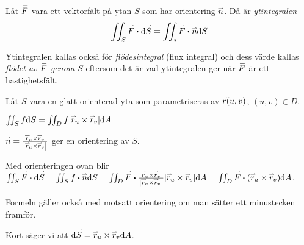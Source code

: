 \documentclass[a4paper]{article}
\begin{document}
\begin{sats}
    Låt \(
        \vef
    \) vara ett vektorfält på ytan \(
        S
    \) som har orientering \(
        \ve{n}
    \). Då är \emph{ytintegralen} \[
        \iint_S \vef \sprod \dd \ve{S} = \iint_s \vef \sprod \ve{n} \dd S
    \] 
\end{sats}

Ytintegralen kallas också för \emph{flödesintegral} (flux integral) och dess 
värde kallas \emph{flödet av \(
    \vef
\) genom \(
    S
\)} eftersom det är vad ytintegralen ger när \(
    \vef
\) är ett hastighetsfält.

\begin{sats}
    Låt \(
        S
    \) vara en glatt orienterad yta som parametriseras av \(
        \ver(u,v)
    \), \(
        (u,v) \in D
    \). 
    \begin{påm}
        \(
            \iint_S f \dd S = \iint_D f \abs{\ver_u \times \ver_v} \dd A
        \) 
    \end{påm}

    \begin{påm}
        \(
            \ven = \frac{\ver_u \times \ver_v}{\abs{\ver_u \times \ver_v}}
        \) ger en orientering av \(
            S
        \).
    \end{påm}

    Med orienteringen ovan blir \(
        \iint_S \vef \sprod \dd \ve{S} = \iint_S f \sprod \ven \dd S 
            = \iint_D \vef \sprod \frac{\ver_u \times \ver_v}{\abs{\ver_u \times \ver_v}} 
                \abs{\ver_u \times \ver_v} \dd A 
            = \iint_D \vef \sprod (\ver_u \times \ver_v) \dd A
    \). 

    Formeln gäller också med motsatt orientering om man sätter ett minustecken 
    framför. 

    Kort säger vi att \(
        \dd \ve{S} = \ver_u \times \ver_v \dd A
    \).
\end{sats}
\end{document}
